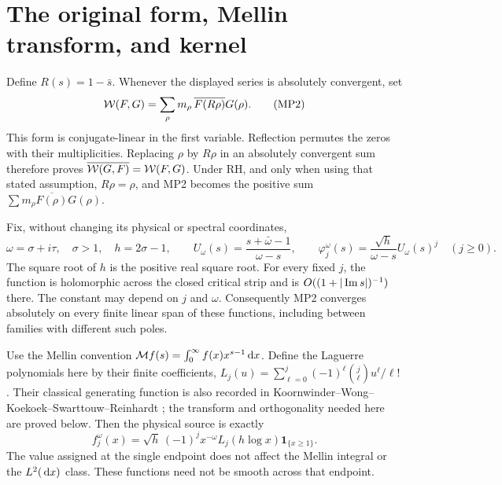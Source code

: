 \section{The original form, Mellin transform, and kernel}
Define $R(s)=1-\bar s$. Whenever the displayed series is absolutely
convergent, set
\begin{equation}
 \mathcal W(F,G)=\sum_\rho m_\rho\,\overline{F(R\rho)}G(\rho).
 \tag{MP2}
\end{equation}
This form is conjugate-linear in the first variable. Reflection permutes
the zeros with their multiplicities. Replacing $\rho$ by $R\rho$ in an
absolutely convergent sum therefore proves
$\overline{\mathcal W(G,F)}=\mathcal W(F,G)$. Under RH, and only when using that stated
assumption, $R\rho=\rho$, and MP2 becomes the positive sum
$\sum m_\rho\overline{F(\rho)}G(\rho)$.

Fix, without changing its physical or spectral coordinates,
\begin{equation}
 \omega=\sigma+i\tau,\quad \sigma>1,\quad h=2\sigma-1,
 \qquad U_\omega(s)=\frac{s+\bar\omega-1}{\omega-s},\qquad
 \varphi_j^\omega(s)=\frac{\sqrt h}{\omega-s}U_\omega(s)^j
 \quad(j\geq0).\tag{MP3}
\end{equation}
The square root of $h$ is the positive real square root. For every fixed
$j$, the function is holomorphic across the closed critical strip and is
$O((1+|\operatorname{Im} s|)^{-1})$ there. The constant may depend on $j$ and $\omega$.
Consequently MP2 converges absolutely on every finite linear span of
these functions, including between families with different such poles.

Use the Mellin convention $\mathcal Mf(s)=\int_0^\infty f(x)x^{s-1}\,\mathrm d x$.
Define the Laguerre polynomials here by their finite coefficients,
$L_j(u)=\sum_{\ell=0}^j(-1)^\ell\binom j\ell u^\ell/\ell!$.
Their classical generating function is also recorded in
Koornwinder--Wong--Koekoek--Swarttouw--Reinhardt \cite{swpole:Laguerre};
the transform and orthogonality needed here are proved below.
Then the physical source is exactly
\begin{equation}
 f_j^\omega(x)=\sqrt h\,(-1)^j x^{-\omega}L_j(h\log x)
                    \mathbf1_{\{x\geq1\}}.
 \tag{MP4}
\end{equation}
The value assigned at the single endpoint does not affect the Mellin
integral or the $L^2(\,\mathrm d x)$ class. These functions need not be smooth
across that endpoint.

